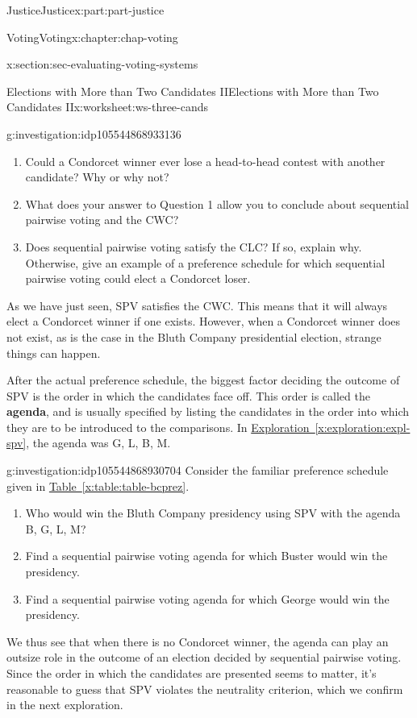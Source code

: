 \documentclass[oneside,10pt,]{book}
\newcommand{\xreffont}{\relax}
\newcommand{\terminology}[1]{\textbf{#1}}
\numberwithin{equation}{section}
\begin{document}
\begin{partptx}{Justice}{}{Justice}{}{}{x:part:part-justice}
\begin{chapterptx}{Voting}{}{Voting}{}{}{x:chapter:chap-voting}
\begin{sectionptx}{}{}{}{}{}{x:section:sec-evaluating-voting-systems}
\begin{worksheet-subsection}{Elections with More than Two Candidates II}{}{Elections with More than Two Candidates II}{}{}{x:worksheet:ws-three-cands}
\begin{investigation}{}{g:investigation:idp105544868933136}
%
\begin{enumerate}[label=(\alph*)]
\item{}Could a Condorcet winner ever lose a head-to-head contest with another candidate? Why or why not?%
\item{}What does your answer to Question 1 allow you to conclude about sequential pairwise voting and the CWC?%
\item{}Does sequential pairwise voting satisfy the CLC? If so, explain why. Otherwise, give an example of a preference schedule for which sequential pairwise voting could elect a Condorcet loser.%
\end{enumerate}
\end{investigation}%
As we have just seen, SPV satisfies the CWC. This means that it will always elect a Condorcet winner if one exists. However, when a Condorcet winner does not exist, as is the case in the Bluth Company presidential election, strange things can happen.%
\par
After the actual preference schedule, the biggest factor deciding the outcome of SPV is the order in which the candidates face off. This order is called the \terminology{agenda}, and is usually specified by listing the candidates in the order into which they are to be introduced to the comparisons. In \hyperref[x:exploration:expl-spv]{Exploration~{\xreffont\ref{x:exploration:expl-spv}}}, the agenda was G, L, B, M.%
\begin{investigation}{}{g:investigation:idp105544868930704}%
Consider the familiar preference schedule given in \hyperref[x:table:table-bcprez]{Table~{\xreffont\ref{x:table:table-bcprez}}}.%
%
\begin{enumerate}[label=(\alph*)]
\item{}Who would win the Bluth Company presidency using SPV with the agenda B, G, L, M?%
\item{}Find a sequential pairwise voting agenda for which Buster would win the presidency.%
\item{}Find a sequential pairwise voting agenda for which George would win the presidency.%
\end{enumerate}
\end{investigation}%
We thus see that when there is no Condorcet winner, the agenda can play an outsize role in the outcome of an election decided by sequential pairwise voting. Since the order in which the candidates are presented seems to matter, it's reasonable to guess that SPV violates the neutrality criterion, which we confirm in the next exploration.%

\end{worksheet-subsection}
\end{sectionptx}
\end{chapterptx}
\end{partptx}
\end{document}
